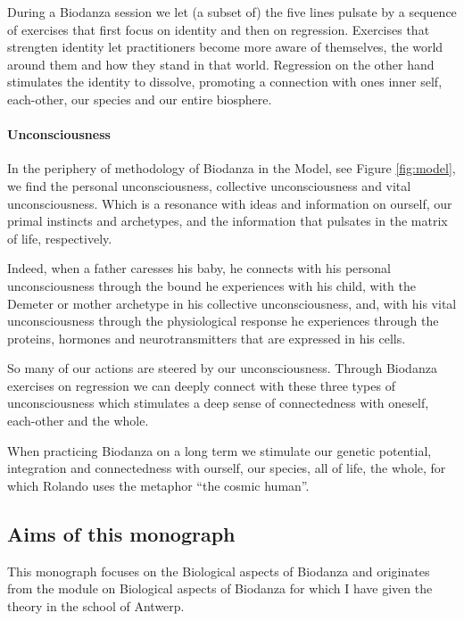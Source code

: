 \documentclass[
]{article}
\begin{document}
During a Biodanza session we let (a subset of) the five lines pulsate by a sequence of exercises that first focus on identity and then on regression.
Exercises that strengten identity let practitioners become more aware of themselves, the world around them and how they stand in that world. Regression on the other hand stimulates the identity to dissolve, promoting a connection with ones inner self, each-other, our species and our entire biosphere.

\hypertarget{unconsciousness}{%
\paragraph{Unconsciousness}\label{unconsciousness}}

In the periphery of methodology of Biodanza in the Model, see Figure \ref{fig:model}, we find the personal unconsciousness, collective unconsciousness and vital unconsciousness.
Which is a resonance with ideas and information on ourself, our primal instincts and archetypes, and the information that pulsates in the matrix of life, respectively.

Indeed, when a father caresses his baby, he connects with
his personal unconsciousness through the bound he experiences with his child, with the Demeter or mother archetype in his collective unconsciousness, and, with his vital unconsciousness through the physiological response he experiences through the proteins, hormones and neurotransmitters that are expressed in his cells.

So many of our actions are steered by our unconsciousness.
Through Biodanza exercises on regression we can deeply connect with these three types of unconsciousness which stimulates a deep sense of connectedness with oneself, each-other and the whole.

When practicing Biodanza on a long term we stimulate our genetic potential, integration and connectedness with ourself, our species, all of life, the whole, for which Rolando uses the metaphor ``the cosmic human''.

\hypertarget{aims-of-this-monograph}{%
\subsection{Aims of this monograph}\label{aims-of-this-monograph}}

This monograph focuses on the Biological aspects of Biodanza and originates from the module on Biological aspects of Biodanza for which I have given the theory in the school of Antwerp.
\end{document}
